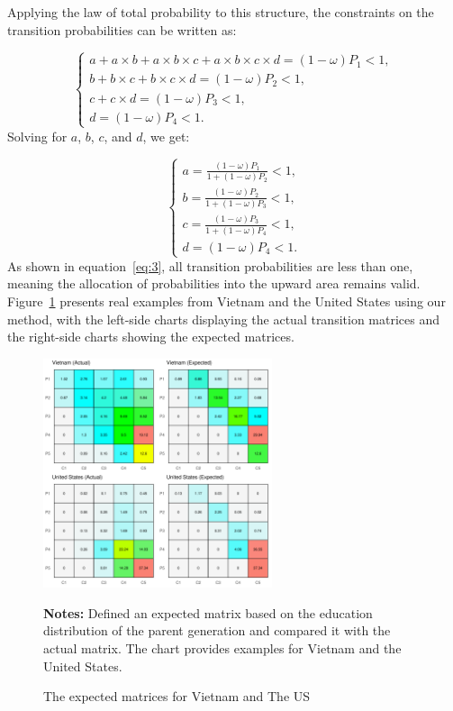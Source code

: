 

Applying the law of total probability to this structure, the constraints on the transition probabilities can be written as:

\[
\begin{cases}
a + a \times b + a \times b \times c + a \times b \times c \times d = (1 - \omega) P_1 < 1, \\
b + b \times c + b \times c \times d = (1 - \omega) P_2 < 1, \\
c + c \times d = (1 - \omega) P_3 < 1, \\
d = (1 - \omega) P_4 < 1.
\end{cases}
\]
Solving for \( a \), \( b \), \( c \), and \( d \), we get:

\begin{equation}
\begin{cases}
\displaystyle a = \frac{(1 - \omega) P_1}{1 + (1 - \omega) P_2} < 1, \\
\displaystyle b = \frac{(1 - \omega) P_2}{1 + (1 - \omega) P_3} < 1, \\
\displaystyle c = \frac{(1 - \omega) P_3}{1 + (1 - \omega) P_4} < 1, \\
\displaystyle d = (1 - \omega) P_4 < 1.
\end{cases}
\label{eq:3}
\end{equation}
As shown in equation~\eqref{eq:3}, all transition probabilities are less than one, meaning the allocation of probabilities into the upward area remains valid. Figure~\ref{fig:VNM_USA} presents real examples from Vietnam and the United States using our method, with the left-side charts displaying the actual transition matrices and the right-side charts showing the expected matrices.

\begin{figure}[h!]
    \centering
    \includegraphics[width=0.6\textwidth]{figs/VNM_USA.pdf}
    \caption{The expected matrices for Vietnam and The US}
    \label{fig:VNM_USA}
    \begin{minipage}{1\linewidth}
    	\vspace{0.2cm}
    	\footnotesize
    	\textbf{Notes:} Defined an expected matrix based on the education distribution of the parent generation and compared it with the actual matrix. The chart provides examples for Vietnam and the United States.
    \end{minipage}
\end{figure}

